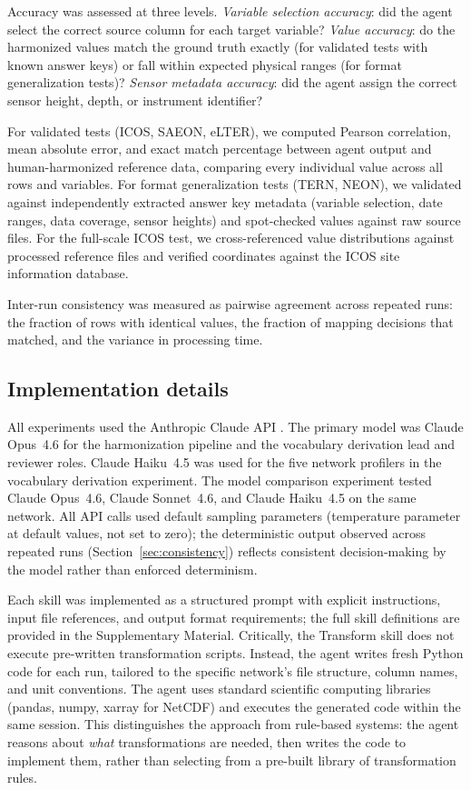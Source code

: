 \documentclass[review,authoryear]{elsarticle}
\begin{document}
Accuracy was assessed at three levels. \emph{Variable selection accuracy}: did the agent select the correct source column for each target variable? \emph{Value accuracy}: do the harmonized values match the ground truth exactly (for validated tests with known answer keys) or fall within expected physical ranges (for format generalization tests)? \emph{Sensor metadata accuracy}: did the agent assign the correct sensor height, depth, or instrument identifier?

For validated tests (ICOS, SAEON, eLTER), we computed Pearson correlation, mean absolute error, and exact match percentage between agent output and human-harmonized reference data, comparing every individual value across all rows and variables. For format generalization tests (TERN, NEON), we validated against independently extracted answer key metadata (variable selection, date ranges, data coverage, sensor heights) and spot-checked values against raw source files. For the full-scale ICOS test, we cross-referenced value distributions against processed reference files and verified coordinates against the ICOS site information database.

Inter-run consistency was measured as pairwise agreement across repeated runs: the fraction of rows with identical values, the fraction of mapping decisions that matched, and the variance in processing time.

\subsection{Implementation details}
\label{sec:implementation}

All experiments used the Anthropic Claude API \citep{anthropic2025claude}. The primary model was Claude Opus~4.6 for the harmonization pipeline and the vocabulary derivation lead and reviewer roles. Claude Haiku~4.5 was used for the five network profilers in the vocabulary derivation experiment. The model comparison experiment tested Claude Opus~4.6, Claude Sonnet~4.6, and Claude Haiku~4.5 on the same network. All API calls used default sampling parameters (temperature parameter at default values, not set to zero); the deterministic output observed across repeated runs (Section~\ref{sec:consistency}) reflects consistent decision-making by the model rather than enforced determinism.

Each skill was implemented as a structured prompt with explicit instructions, input file references, and output format requirements; the full skill definitions are provided in the Supplementary Material. Critically, the Transform skill does not execute pre-written transformation scripts. Instead, the agent writes fresh Python code for each run, tailored to the specific network's file structure, column names, and unit conventions. The agent uses standard scientific computing libraries (pandas, numpy, xarray for NetCDF) and executes the generated code within the same session. This distinguishes the approach from rule-based systems: the agent reasons about \emph{what} transformations are needed, then writes the code to implement them, rather than selecting from a pre-built library of transformation rules.
\end{document}
